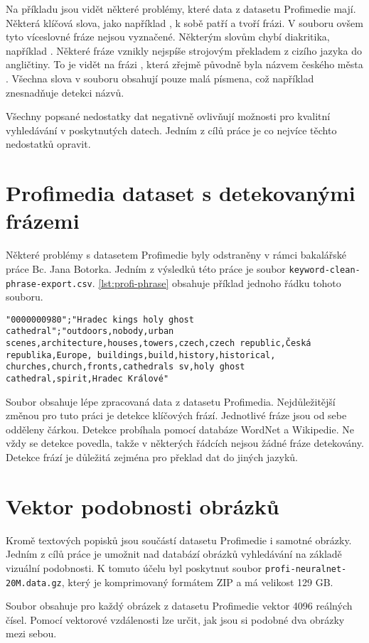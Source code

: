 Na příkladu jsou vidět některé problémy, které data z datasetu Profimedie mají. Některá klíčová slova, jako například , k sobě patří a tvoří frázi. V souboru ovšem tyto víceslovné fráze nejsou vyznačené. Některým slovům chybí diakritika, například . Některé fráze vznikly nejspíše strojovým překladem z cizího jazyka do angličtiny. To je vidět na frázi , která zřejmě původně byla názvem českého města . Všechna slova v souboru obsahují pouze malá písmena, což například znesnadňuje detekci názvů.

Všechny popsané nedostatky dat negativně ovlivňují možnosti pro kvalitní vyhledávání v poskytnutých datech. Jedním z cílů práce je co nejvíce těchto nedostatků opravit.

\section{Profimedia dataset s detekovanými frázemi}

Některé problémy s datasetem Profimedie byly odstraněny v rámci bakalářské práce Bc. Jana Botorka\cite{botorek}. Jedním z výsledků této práce je soubor \lstinline{keyword-clean-phrase-export.csv}. \autoref{lst:profi-phrase} obsahuje příklad jednoho řádku tohoto souboru.

\begin{lstlisting}[caption={Řádek souboru keyword-clean-phrase-export.csv},label={lst:profi-phrase}]
"0000000980";"Hradec kings holy ghost cathedral";"outdoors,nobody,urban scenes,architecture,houses,towers,czech,czech republic,Česká republika,Europe, buildings,build,history,historical, churches,church,fronts,cathedrals sv,holy ghost cathedral,spirit,Hradec Králové"
\end{lstlisting}

Soubor obsahuje lépe zpracovaná data z datasetu Profimedia. Nejdůležitější změnou pro tuto práci je detekce klíčových frází. Jednotlivé fráze jsou od sebe odděleny čárkou. Detekce probíhala pomocí databáze WordNet\cite{wordnet} a Wikipedie. Ne vždy se detekce povedla, takže v některých řádcích nejsou žádné fráze detekovány. Detekce frází je důležitá zejména pro překlad dat do jiných jazyků.

\section{Vektor podobnosti obrázků}

Kromě textových popisků jsou součástí datasetu Profimedie i samotné obrázky. Jedním z cílů práce je umožnit nad databází obrázků vyhledávání na základě vizuální podobnosti. K tomuto účelu byl poskytnut soubor \lstinline{profi-neuralnet-20M.data.gz}, který je komprimovaný formátem ZIP a má velikost 129 GB.

Soubor obsahuje pro každý obrázek z datasetu Profimedie vektor 4096 reálných čísel. Pomocí vektorové vzdálenosti lze určit, jak jsou si podobné dva obrázky mezi sebou.


